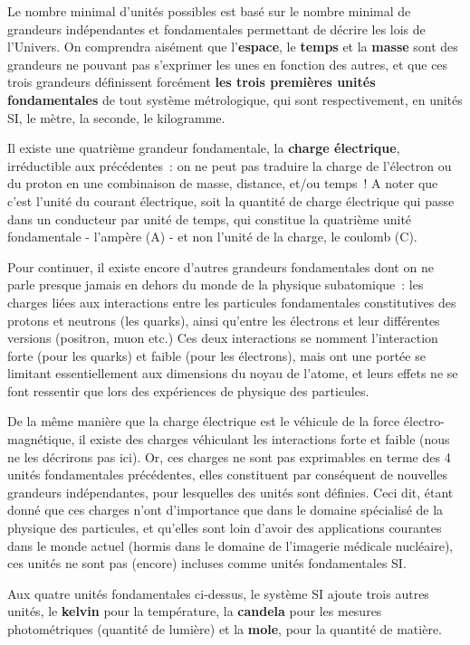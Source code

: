 Le nombre minimal d'unités possibles est basé sur le nombre minimal de grandeurs indépendantes et fondamentales permettant de décrire les lois de l'Univers. On comprendra aisément que l'\textbf{espace}, le \textbf{temps} et la \textbf{masse} sont des grandeurs ne pouvant pas s'exprimer les unes en fonction des autres, et que ces trois grandeurs définissent forcément \textbf{les trois premières unités fondamentales} de tout système métrologique, qui sont respectivement, en unités SI, le mètre, la seconde, le kilogramme.

Il existe une quatrième grandeur fondamentale, la \textbf{charge électrique}, irréductible aux  précédentes~: on ne peut pas traduire la charge de l'électron ou du proton en une combinaison de masse, distance, et/ou temps~! A noter que c'est l'unité du courant électrique, soit la quantité de charge électrique qui passe dans un conducteur par unité de temps, qui constitue la quatrième unité fondamentale - l'ampère (A) - et non l'unité de la charge, le coulomb (C).

Pour continuer, il existe encore d'autres grandeurs fondamentales dont on ne parle presque jamais en dehors du monde de la physique subatomique~: les charges liées aux interactions entre les particules fondamentales constitutives des protons et neutrons (les quarks), ainsi qu'entre les électrons et leur différentes versions (positron, muon etc.) Ces deux interactions se nomment l'interaction forte (pour les quarks) et faible (pour les électrons), mais ont une portée se limitant essentiellement aux dimensions du noyau de l'atome, et leurs effets ne se font ressentir que lors des expériences de physique des particules.

De la même manière que la charge électrique est le véhicule de la force électro-magnétique, il existe des charges véhiculant les interactions forte et faible (nous ne les décrirons pas ici). Or, ces charges ne sont pas exprimables en terme des 4 unités fondamentales précédentes, elles constituent par conséquent de nouvelles grandeurs indépendantes, pour lesquelles des unités sont définies. Ceci dit, étant donné que ces charges n'ont d'importance que dans le domaine spécialisé de la physique des particules, et qu'elles sont loin d'avoir des applications courantes dans le monde actuel (hormis dans le domaine de l'imagerie médicale nucléaire), ces unités ne sont pas (encore) incluses comme unités fondamentales SI.

Aux quatre unités fondamentales ci-dessus, le système SI ajoute trois autres unités, le \textbf{kelvin} pour la température, la \textbf{candela} pour les mesures photométriques (quantité de lumière) et la \textbf{mole}, pour la quantité de matière.

